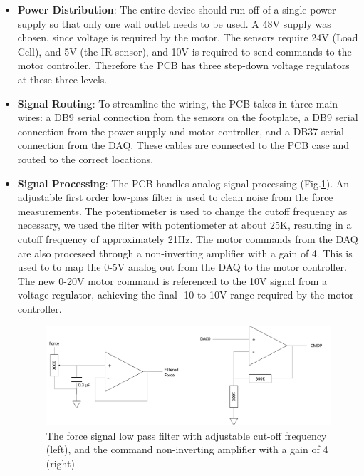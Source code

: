 \documentclass[12pt]{report}
\begin{document}
	\begin{itemize}
	\item \textbf{Power Distribution}: The entire device should run off of a single power supply so that only one wall outlet needs to be used. A 48V supply was chosen, since voltage is required by the motor. The sensors require 24V (Load Cell), and 5V (the IR sensor), and 10V is required to send commands to the motor controller. Therefore the PCB has three step-down voltage regulators at these three levels.
	\item \textbf{Signal Routing}: To streamline the wiring, the PCB takes in three main wires: a DB9 serial connection from the sensors on the footplate, a DB9 serial connection from  the power supply and motor controller, and a DB37 serial connection from the DAQ. These cables are connected to the PCB case and routed to the correct locations.
	\item \textbf{Signal Processing}: The PCB handles analog signal processing (Fig.\ref{fig:amp}). An adjustable first order low-pass filter is used to clean noise from the force measurements. The potentiometer is used to change the cutoff frequency as necessary, we used the filter with potentiometer at about 25K, resulting in a cutoff frequency of approximately 21Hz. The motor commands from the DAQ are also processed through a non-inverting amplifier with a gain of 4. This is used to to map the 0-5V analog out from the DAQ to the motor controller. The new 0-20V motor command is referenced to the 10V signal from a voltage regulator, achieving the final -10 to 10V range required by the motor controller. 

	\begin{figure}[h] 
		\centering
		\includegraphics[width=\linewidth]{amplifier2}
		\caption{The force signal low pass filter with adjustable cut-off frequency (left), and the command non-inverting amplifier with a gain of 4 (right)}
		\label{fig:amp}
	\end{figure}	
	

\end{itemize}
\end{document}
